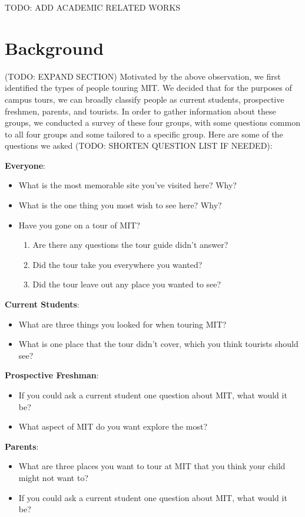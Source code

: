 \documentclass{sigchi}
\begin{document}
TODO: ADD ACADEMIC RELATED WORKS

\section{Background}

(TODO: EXPAND SECTION)
Motivated by the above observation, we first identified the types of people touring MIT. We decided that for the purposes of campus tours, we can broadly classify people as current students, prospective freshmen, parents, and tourists. In order to gather information about these groups, we conducted a survey of these four groups, with some questions common to all four groups and some tailored to a specific group. Here are some of the questions we asked (TODO: SHORTEN QUESTION LIST IF NEEDED):

\textbf{Everyone}:

\begin{itemize}
	\item What is the most memorable site you’ve visited here? Why?
	\item What is the one thing you most wish to see here? Why?
	\item Have you gone on a tour of MIT?
	\begin{enumerate}
		\item Are there any questions the tour guide didn’t answer?
		\item Did the tour take you everywhere you wanted?
		\item Did the tour leave out any place you wanted to see?
	\end{enumerate}
\end{itemize}

\textbf{Current Students}:
\begin{itemize}
	\item What are three things you looked for when touring MIT?
	\item What is one place that the tour didn’t cover, which you think tourists should see?
\end{itemize}

\textbf{Prospective Freshman}:
\begin{itemize}
	\item If you could ask a current student one question about MIT, what would it be?
	\item What aspect of MIT do you want explore the most?
\end{itemize}

\textbf{Parents}:
\begin{itemize}
	\item What are three places you want to tour at MIT that you think your child might not want to?
	\item If you could ask a current student one question about MIT, what would it be?
\end{itemize}
\end{document}
